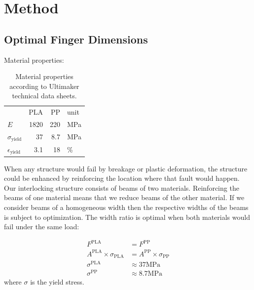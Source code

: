 

\section{Method}


\newpage

\subsection{Optimal Finger Dimensions}
Material properties:
\begin{table}[h!]
\centering
		\caption{Material properties according to Ultimaker technical data sheets.}
		\label{tab:mat_props}
	\begin{tabular}{lrrl}
		& PLA & PP & unit \\
		$E$ & {1820} &  {220} & \si{\mega\pascal} \\
		$\sigma_\text{yield}$ & {37}& {8.7} & \si{\mega\pascal} \\
		$\epsilon_\text{yield}$ & {3.1}& {18} & \si{\percent} \\
	\end{tabular}
\end{table}


When any structure would fail by breakage or plastic deformation,
the structure could be enhanced by reinforcing the location where that fault would happen.
Our interlocking structure consists of beams of two materials.
Reinforcing the beams of one material means that we reduce beams of the other material.
If we consider beams of a homogeneous width then the respective widths of the beams is subject to optimization.
The width ratio is optimal when both materials would fail under the same load:

\begin{align*}
	F^\text{PLA} &= F^\text{PP} \\
	A^\text{PLA} \times \sigma_\text{PLA} &= 	A^\text{PP} \times \sigma_\text{PP}\\
	\sigma^\text{PLA} &\approx 37 \si{\mega\pascal} \\
	\sigma^\text{PP} &\approx 8.7 \si{\mega\pascal}
\end{align*}
where $\sigma$ is the yield stress.

